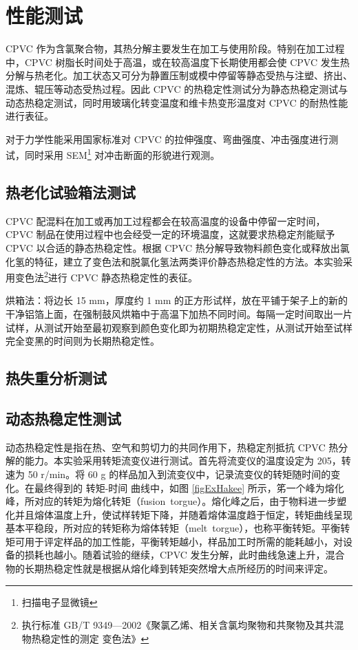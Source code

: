 \section{性能测试}
CPVC 作为含氯聚合物，其热分解主要发生在加工与使用阶段。特别在加工过程中，CPVC 树脂长时间处于高温，或在较高温度下长期使用都会使 CPVC 发生热分解与热老化。加工状态又可分为静置压制或模中停留等静态受热与注塑、挤出、混炼、辊压等动态受热过程。因此 CPVC 的热稳定性测试分为静态热稳定测试与动态热稳定测试，同时用玻璃化转变温度和维卡热变形温度对 CPVC 的耐热性能进行表征。\par
对于力学性能采用国家标准对 CPVC 的拉伸强度、弯曲强度、冲击强度进行测试，同时采用 SEM\footnote{扫描电子显微镜} 对冲击断面的形貌进行观测。

\subsection{热老化试验箱法测试}
CPVC 配混料在加工或再加工过程都会在较高温度的设备中停留一定时间，CPVC 制品在使用过程中也会经受一定的环境温度，这就要求热稳定剂能赋予 CPVC 以合适的静态热稳定性。根据 CPVC 热分解导致物料颜色变化或释放出氯化氢的特征，建立了变色法和脱氯化氢法两类评价静态热稳定性的方法。本实验采用变色法\footnote{执行标准 GB/T 9349—2002《聚氯乙烯、相关含氯均聚物和共聚物及其共混物热稳定性的测定 变色法》}进行 CPVC 静态热稳定性的表征。\par
烘箱法：将边长 15 mm，厚度约 1 mm 的正方形试样，放在平铺于架子上的新的干净铝箔上面，在强制鼓风烘箱中于高温下加热不同时间。每隔一定时间取出一片试样，从测试开始至最初观察到颜色变化即为初期热稳定定性，从测试开始至试样完全变黑的时间则为长期热稳定性。

\subsection{热失重分析测试}

\subsection{动态热稳定性测试}\label{sectionHakee}
动态热稳定性是指在热、空气和剪切力的共同作用下，热稳定剂抵抗 CPVC 热分解的能力。本实验采用转矩流变仪进行测试。首先将流变仪的温度设定为 205\cd，转速为 50 r/min。将 60 g 的样品加入到流变仪中，记录流变仪的转矩随时间的变化。在最终得到的 转矩-时间 曲线中，如图 \ref{figExHakee} 所示，笫一个峰为熔化峰，所对应的转矩为熔化转矩（fusion torgue）。熔化峰之后，由于物料进一步塑化并且熔体温度上升，使试样转矩下降，并随着熔体温度趋于恒定，转矩曲线呈现基本平稳段，所对应的转矩称为熔体转矩（melt torgue），也称平衡转矩。平衡转矩可用于评定样品的加工性能，平衡转矩越小，样品加工时所需的能耗越小，对设备的损耗也越小。随着试验的继续，CPVC 发生分解，此时曲线急速上升，混合物的长期热稳定性就是根据从熔化峰到转矩突然增大点所经历的时间来评定。

